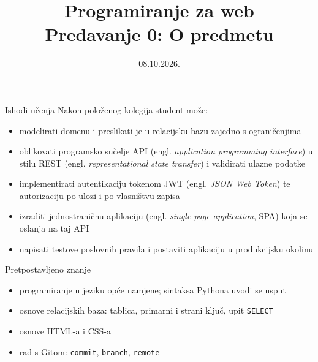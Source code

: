 

\title[Predavanje 0: O predmetu]{Programiranje za web \\ Predavanje 0: O predmetu}
\date{08.10.2026.}



\frame{\titlepage}


\begin{frame}{Ishodi učenja}
Nakon položenog kolegija student može:

\begin{itemize}
  \item modelirati domenu i preslikati je u relacijsku bazu zajedno s ograničenjima
  \item oblikovati programsko sučelje API (engl. \emph{application programming interface}) u stilu REST (engl. \emph{representational state transfer}) i validirati ulazne podatke
  \item implementirati autentikaciju tokenom JWT (engl. \emph{JSON Web Token}) te autorizaciju po ulozi i po vlasništvu zapisa
  \item izraditi jednostraničnu aplikaciju (engl. \emph{single-page application}, SPA) koja se oslanja na taj API
  \item napisati testove poslovnih pravila i postaviti aplikaciju u produkcijsku okolinu
\end{itemize}
\end{frame}

\begin{frame}{Pretpostavljeno znanje}
\begin{itemize}
  \item programiranje u jeziku opće namjene; sintaksa Pythona uvodi se usput
  \item osnove relacijskih baza: tablica, primarni i strani ključ, upit \texttt{SELECT}
  \item osnove HTML-a i CSS-a
  \item rad s Gitom: \texttt{commit}, \texttt{branch}, \texttt{remote}
\end{itemize}

\vspace{0.4em}

\end{frame}

